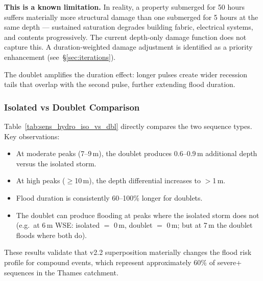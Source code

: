 \documentclass[11pt,a4paper]{article}
\begin{document}
\textbf{This is a known limitation.}  In reality, a property submerged for 50
hours suffers materially more structural damage than one submerged for 5 hours at
the same depth --- sustained saturation degrades building fabric, electrical
systems, and contents progressively.  The current depth-only damage function does
not capture this.  A duration-weighted damage adjustment is identified as a
priority enhancement (see~\S\ref{sec:iterations}).

The doublet amplifies the duration effect: longer pulses create wider recession
tails that overlap with the second pulse, further extending flood duration.

\subsubsection{Isolated vs Doublet Comparison}
Table~\ref{tab:sens_hydro_iso_vs_dbl} directly compares the two sequence types.
Key observations:
\begin{itemize}[nosep]
    \item At moderate peaks (7--9\,m), the doublet produces 0.6--0.9\,m additional
          depth versus the isolated storm.
    \item At high peaks ($\geq$10\,m), the depth differential increases to
          $>$1\,m.
    \item Flood duration is consistently 60--100\% longer for doublets.
    \item The doublet can produce flooding at peaks where the isolated storm does
          not (e.g.\ at 6\,m WSE: isolated $=$ 0\,m, doublet $=$ 0\,m; but at
          7\,m the doublet floods where both do).
\end{itemize}

\noindent These results validate that v2.2 superposition materially changes the
flood risk profile for compound events, which represent approximately 60\% of
severe+ sequences in the Thames catchment.

\mkmlimitations
\end{document}
